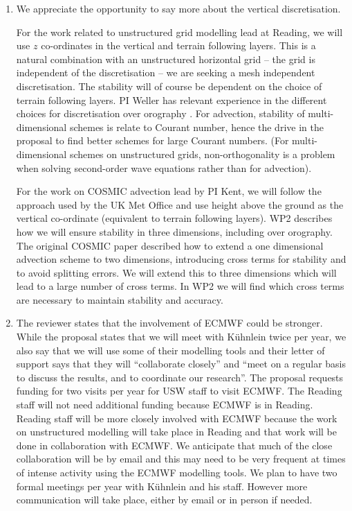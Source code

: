 \begin{enumerate}

\item \label{it:horizVert} We appreciate the opportunity to say more about the vertical discretisation.

For the work related to unstructured grid modelling lead at Reading, we will use $z$ co-ordinates in the vertical and terrain following layers. This is a natural combination with an unstructured horizontal grid -- the grid is independent of the discretisation -- we are seeking a mesh independent discretisation. The stability will of course be dependent on the choice of terrain following layers. PI Weller has relevant experience in the different choices for discretisation over orography \cite[]{WS14,SW16,CWPS17,SWMD17}. For advection, stability of multi-dimensional schemes is relate to Courant number, hence the drive in the proposal to find better schemes for large Courant numbers. (For multi-dimensional schemes on unstructured grids, non-orthogonality is a problem when solving second-order wave equations rather than for advection).

For the work on COSMIC advection lead by PI Kent, we will follow the approach used by the UK Met Office and use height above the ground as the vertical co-ordinate (equivalent to terrain following layers). WP2 describes how we will ensure stability in three dimensions, including over orography. The original COSMIC paper \cite[]{LLM96} described how to extend a one dimensional advection scheme to two dimensions, introducing cross terms for stability and to avoid splitting errors. We will extend this to three dimensions which will lead to a large number of cross terms. In WP2 we will find which cross terms are necessary to maintain stability and accuracy.

\item \label{it:Kuhnlein} The reviewer states that the involvement of ECMWF could be stronger. While the proposal states that we will meet with K\"uhnlein twice per year, we also say that we will use some of their modelling tools and their letter of support says that they will ``collaborate closely'' and ``meet on a regular basis to discuss the results, and to coordinate our research''. The proposal requests funding for two visits per year for USW staff to visit ECMWF. The Reading staff will not need additional funding because ECMWF is in Reading. Reading staff will be more closely involved with ECMWF because the work on unstructured modelling will take place in Reading and that work will be done in collaboration with ECMWF. We anticipate that much of the close collaboration will be by email and this may need to be very frequent at times of intense activity using the ECMWF modelling tools. We plan to have two formal meetings per year with K\"uhnlein and his staff. However more communication will take place, either by email or in person if needed.


\end{enumerate}
